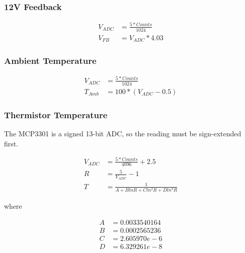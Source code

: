 \documentclass{article}
\begin{document}
\subsubsection{12V Feedback}
\begin{align*}
    V_{ADC} &= \frac{5 * Counts}{1024}\\
    V_{FB}  &= V_{ADC} * 4.03
\end{align*}

\subsubsection{Ambient Temperature}
\begin{align*}
    V_{ADC} &= \frac{5 * Counts}{1024} \\
    T_{Amb} &= 100 * (V_{ADC} - 0.5)
\end{align*}

\subsubsection{Thermistor Temperature}
The MCP3301 is a signed 13-bit ADC, so the reading must be sign-extended first.

\begin{align*}
    V_{ADC} &= \frac{5 * Counts}{4096} + 2.5 \\
    R &= \frac{5}{V_{ADC}} - 1 \\
    T &= \frac{1}{A + BlnR + Cln^2R + Dln^3R}
\end{align*}

where

\begin{align*}
    A &= 0.0033540164 \\
    B &= 0.0002565236 \\
    C &= 2.605970e-6 \\
    D &= 6.329261e-8
\end{align*}
\end{document}
